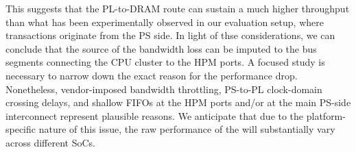 {%
    This suggests that the PL-to-DRAM route can sustain a much higher throughput
    than what has been experimentally observed in our evaluation setup, where
    transactions originate from the PS side.
    In light of thse considerations, we can conclude that the source of the
    bandwidth loss can be imputed to the bus segments connecting the CPU cluster to the HPM ports.
    A focused study is necessary to narrow down the exact reason for
    the performance drop. Nonetheless, vendor-imposed bandwidth
    throttling, PS-to-PL clock-domain crossing delays, and shallow
    FIFOs at the HPM ports and/or at the main PS-side interconnect
    represent plausible reasons. We anticipate that due to the
    platform-specific nature of this issue, the raw performance of the
    \schim will substantially vary across different SoCs.}
